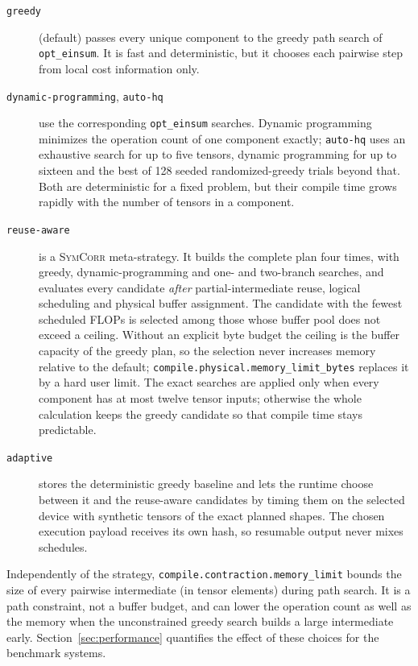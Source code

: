 \documentclass[a4paper,fleqn]{cas-dc}
\begin{document}
\begin{description}
\item[\texttt{greedy}] (default) passes every unique component to the greedy
path search of \texttt{opt\_einsum}. It is fast and deterministic, but it chooses
each pairwise step from local cost information only.
\item[\texttt{dynamic-programming}, \texttt{auto-hq}] use the corresponding
\texttt{opt\_einsum} searches. Dynamic programming minimizes the operation count
of one component exactly; \texttt{auto-hq} uses an exhaustive search for up to
five tensors, dynamic programming for up to sixteen and the best of 128 seeded
randomized-greedy trials beyond that. Both are deterministic for a fixed problem, but their
compile time grows rapidly with the number of tensors in a component.
\item[\texttt{reuse-aware}] is a \textsc{SymCorr} meta-strategy. It builds the
complete plan four times, with greedy, dynamic-programming and one- and
two-branch searches, and evaluates every candidate \emph{after} partial-intermediate
reuse, logical scheduling and physical buffer assignment. The candidate with the
fewest scheduled FLOPs is selected among those whose buffer pool does not exceed
a ceiling. Without an explicit byte budget the ceiling is the buffer capacity of
the greedy plan, so the selection never increases memory relative to the
default; \texttt{compile.physical.memory\_limit\_bytes} replaces it by a hard
user limit. The exact searches are applied only when every component has at most
twelve tensor inputs; otherwise the whole calculation keeps the greedy candidate
so that compile time stays predictable.
\item[\texttt{adaptive}] stores the deterministic greedy baseline and lets the
runtime choose between it and the reuse-aware candidates by timing them on the
selected device with synthetic tensors of the exact planned shapes. The chosen
execution payload receives its own hash, so resumable output never mixes
schedules.
\end{description}

Independently of the strategy, \texttt{compile.contraction.memory\_limit} bounds
the size of every pairwise intermediate (in tensor elements) during path search.
It is a path constraint, not a buffer budget, and can lower the operation count
as well as the memory when the unconstrained greedy search builds a large
intermediate early. Section~\ref{sec:performance} quantifies the effect of these
choices for the benchmark systems.
\end{document}
